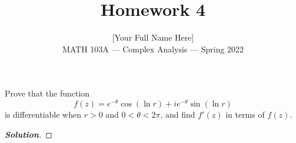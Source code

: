 \documentclass[11pt]{article}
\newenvironment{problem}[2][Problem\!]{\begin{trivlist}
\item[\hskip \labelsep {\bfseries #1}\hskip \labelsep {\bfseries #2.}]}{\end{trivlist}}
\newenvironment{solution}{\begin{proof}[\textbf{\textit{Solution}}]}{\end{proof}}
\begin{document}
 
\title{Homework 4}
\author{[Your Full Name Here]\\[0.5em]
MATH 103A --- Complex Analysis --- Spring 2022}
\date{} 
\maketitle


\begin{problem}{4.1}
Prove that the function
\[f(z) = e^{-\theta}\cos(\ln r) + ie^{-\theta}\sin(\ln r)\]
is differentiable when $r > 0$ and $0 < \theta < 2\pi$, and find $f'(z)$ in terms of $f(z)$.
\end{problem}
\begin{solution}
\end{solution}

\newpage  %
\end{document}
